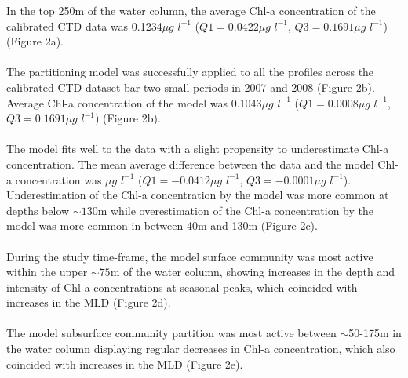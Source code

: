 \documentclass{article}
\begin{document}
In the top 250m of the water column, the average Chl-a concentration of the calibrated CTD data was 0.1234$\mu g$ $l ^{-1}$ ($Q1 = 0.0422\mu g$ $l ^{-1}$, $Q3 = 0.1691\mu g$ $l ^{-1}$) (Figure 2a). \\ \\
The partitioning model was successfully applied to all the profiles across the calibrated CTD dataset bar two small periods in 2007 and 2008 (Figure 2b). Average Chl-a concentration of the model was 0.1043$\mu g$ $l ^{-1}$ ($Q1 = 0.0008\mu g$ $l ^{-1}$, $Q3 = 0.1691\mu g$ $l ^{-1}$) (Figure 2b).\\ \\
The model fits well to the data with a slight propensity to underestimate Chl-a concentration. The mean average difference between the data and the model Chl-a concentration was $\mu g$ $l ^{-1}$ ($Q1 = - 0.0412\mu g$ $l ^{-1}$, $Q3 = - 0.0001\mu g$ $l ^{-1}$). Underestimation of the Chl-a concentration by the model was more common at depths below $\sim 130$m while overestimation of the Chl-a concentration by the model was more common in between 40m and 130m (Figure 2c).\\ \\
During the study time-frame, the model surface community was most active within the upper $\sim 75$m of the water column, showing increases in the depth and intensity of Chl-a concentrations at seasonal peaks, which coincided with increases in the MLD (Figure 2d).\\ \\
The model subsurface community partition was most active between $\sim$50-175m in the water column displaying regular decreases in Chl-a concentration, which also coincided with increases in the MLD (Figure 2e).%
\end{document}
